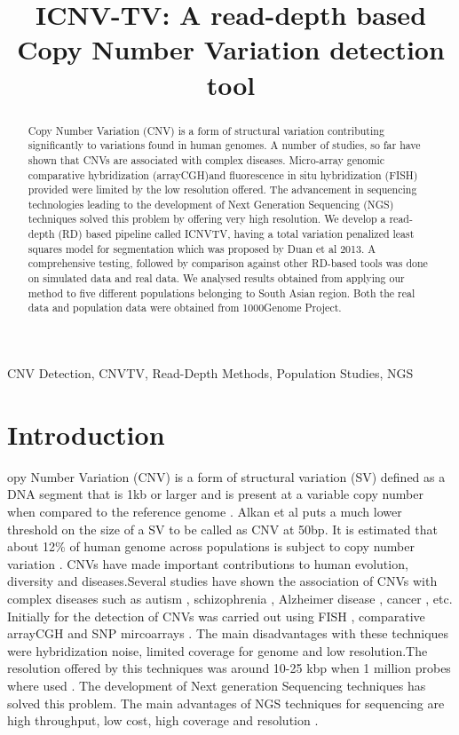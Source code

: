 \documentclass[twocolumn,oneside,conference]
{IEEEtran}
\title{ICNV-TV: A read-depth based Copy Number Variation detection tool}
\author{
	\IEEEauthorblockN{Sriharsha Vogeti} 
	\IEEEauthorblockA{CCNSB,IIIT-Hyderabad\\
	vogetisri.harsha@research.iiit.ac.in}
	\and
	\IEEEauthorblockN{Prashanthi D} 
	\IEEEauthorblockA{CCNSB,IIIT-Hyderabad\\
	prashanthi.d@research.iiit.ac.in}
	\and
	\IEEEauthorblockN{Nita Parekh} 
	\IEEEauthorblockA{CCNSB, IIIT-Hyderabad\\
	nita@iiit.ac.in}
	
}
\begin{document}
\maketitle


 
\begin{abstract}
Copy Number Variation (CNV) is a form of structural variation contributing significantly to variations found in human genomes. A number of studies, so far have shown that CNVs are associated with complex diseases. Micro-array genomic comparative hybridization   (arrayCGH)and fluorescence in situ hybridization (FISH) provided were limited by the low resolution offered. The advancement in sequencing technologies leading to the development of Next Generation Sequencing (NGS) techniques solved this problem by offering very high resolution. We develop a read-depth (RD) based pipeline called ICNVTV, having a total variation penalized least squares model for segmentation which was proposed by Duan et al 2013. A comprehensive testing, followed by comparison against other RD-based tools was done on simulated data and real data. We analysed results obtained from applying our method to five different populations belonging to South Asian region. Both the real data and population data were obtained from 1000Genome Project. \\
\end{abstract}
 
\begin{IEEEkeywords}
CNV Detection, CNVTV, Read-Depth Methods, Population Studies, NGS\\
\end{IEEEkeywords}
\section{Introduction}
opy Number Variation (CNV) is a form of structural variation (SV) defined as a DNA segment that is 1kb or larger and is present at a variable copy number when compared to the reference genome \cite{first}. Alkan et al \cite{2} puts a much lower threshold on the size of a SV to be called as CNV at 50bp. It is estimated that about 12\% of human genome across populations is subject to copy number variation \cite{first}. CNVs have made important contributions to human evolution, diversity \cite{7} and diseases.Several studies have shown the association of CNVs with complex diseases such as autism \cite{3}, schizophrenia \cite{4}, Alzheimer disease \cite{5}, cancer \cite{6}, etc. Initially for the detection of CNVs was carried out using FISH \cite{9}, comparative arrayCGH and SNP mircoarrays \cite{10}. The main disadvantages with these techniques were hybridization noise, limited coverage for genome and low resolution.The resolution offered by this techniques was around 10-25 kbp when 1 million probes where used \cite{8}. The development of Next generation Sequencing techniques has solved this problem. The main advantages of NGS techniques for sequencing are high throughput, low cost, high coverage and resolution \cite{11}. 
\end{document}
